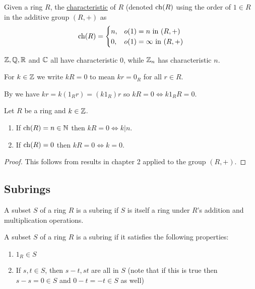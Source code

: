 \documentclass[11pt]{article}
\begin{document}
\begin{definition}
    Given a ring $R$, the \ul{characteristic} of $R$ (denoted $\operatorname{ch}(R)$ using the order of $1\in R$ in the additive group $(R,+)$ as
    \[\operatorname{ch}(R)=\begin{cases}n,&o(1)=n\text{ in }(R,+)\\0,&o(1)=\infty\text{ in }(R,+)\end{cases}\]
\end{definition}

\begin{example}
    $\mathbb{Z},\mathbb{Q},\mathbb{R}$ and $\mathbb{C}$ all have characteristic 0, while $\mathbb{Z}_n$ has characteristic $n$.
\end{example}

\begin{definition}
    For $k\in\mathbb{Z}$ we write $kR=0$ to mean $kr=0_R$ for all $r\in R$.
\end{definition}

\begin{note}
    By  we have $kr=k(1_Rr)=(k1_R)r$
    so $kR=0\iff k1_RR=0$.
\end{note}

\begin{theorem}
    Let $R$ be a ring and $k\in\mathbb{Z}$.
    \begin{enumerate}
        \item If $\operatorname{ch}(R)=n\in\mathbb{N}$ then $kR=0\iff k|n$.
        \item If $\operatorname{ch}(R)=0$ then $kR=0\iff k=0$.
    \end{enumerate}
\end{theorem}

\begin{proof}
    This follows from results in chapter 2 applied to the group $(R,+)$.
\end{proof}

\subsection{Subrings}

\begin{definition}[Subrings]
    A subset $S$ of a ring $R$ is a subring if $S$ is itself a ring under $R$'s addition and multiplication operations.
\end{definition}

\begin{proposition}
    A subset $S$ of a ring $R$ is a subring if it satisfies the following properties:
    \begin{enumerate}
        \item $1_R\in S$
        \item If $s,t\in S$, then $s-t,st$ are all in $S$ (note that if this is true then $s-s=0\in S$ and $0-t=-t\in S$ as well)
    \end{enumerate}
\end{proposition}
\end{document}
